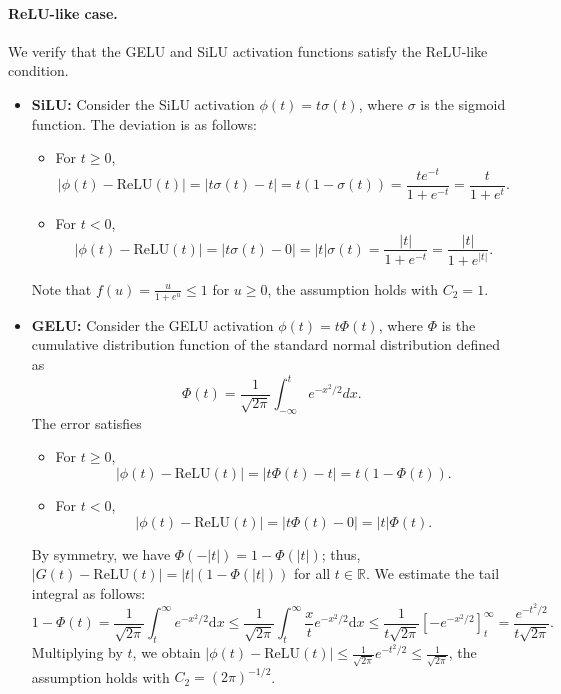 \documentclass[11pt]{article}
\begin{document}
\paragraph{ReLU-like case.}
We verify that the GELU and SiLU activation functions satisfy the ReLU-like condition.
\begin{itemize}
    \item \textbf{SiLU:} Consider the SiLU activation $\phi(t) = t\sigma(t)$, where $\sigma$ is the sigmoid function. The deviation is as follows:
    \begin{itemize}
    \item For $t \geq 0$, 
    \begin{equation*}
        |\phi(t) - \text{ReLU}(t)| = |t\sigma(t) - t| = t(1 - \sigma(t)) = \frac{t e^{-t}}{1+e^{-t}} = \frac{t}{1+e^t}.
    \end{equation*}
    \item For $t < 0$,
    \begin{equation*}
        |\phi(t) - \text{ReLU}(t)|= |t\sigma(t) - 0| = |t|\sigma(t) = \frac{|t|}{1+e^{-t}} = \frac{|t|}{1+e^{|t|}}.
    \end{equation*}
\end{itemize}
    Note that $f(u) = \frac{u}{1+e^u}\le 1$ for $u \geq 0$, the assumption holds with $C_2 = 1$.

    \item \textbf{GELU:} Consider the GELU activation $\phi(t) = t \Phi(t)$, where $\Phi$ is the cumulative distribution function of the standard normal distribution defined as
    \begin{equation*}
        \Phi(t) = \frac{1}{\sqrt{2\pi}} \int_{-\infty}^t e^{-x^2/2} dx.
    \end{equation*}
    The error satisfies
    \begin{itemize}
    \item For $t \geq 0$, 
    \begin{equation*}
        |\phi(t) - \text{ReLU}(t)| = |t\Phi(t) - t| = t(1 - \Phi(t)).
    \end{equation*}
    \item For $t < 0$,
    \begin{equation*}
        |\phi(t) - \text{ReLU}(t)| = |t\Phi(t) - 0| = |t|\Phi(t).
    \end{equation*}
\end{itemize}
    By symmetry, we have $\Phi(-|t|) = 1 - \Phi(|t|)$; thus, $|G(t) - \text{ReLU}(t)| = |t|(1-\Phi(|t|))$ for all $t \in \mathbb{R}$. 
    We estimate the tail integral as follows:
    \begin{equation*}
        1 - \Phi(t) = \frac{1}{\sqrt{2\pi}} \int_t^\infty e^{-x^2/2} \mathrm{d}x \leq \frac{1}{\sqrt{2\pi}} \int_t^\infty \frac{x}{t} e^{-x^2/2} \mathrm{d}x
        \leq \frac{1}{t\sqrt{2\pi}} \left[ -e^{-x^2/2} \right]_t^\infty = \frac{e^{-t^2/2}}{t\sqrt{2\pi}}.
    \end{equation*}
    Multiplying by $t$, we obtain $|\phi(t) - \text{ReLU}(t)| \leq \frac{1}{\sqrt{2\pi}} e^{-t^2/2} \leq \frac{1}{\sqrt{2\pi}}$, the assumption holds with $C_2 = (2\pi)^{-1/2}$.
\end{itemize}
\end{document}
